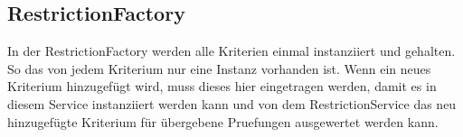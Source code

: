 \subsection{RestrictionFactory}\label{subsec:RestrictionFactory}
In der RestrictionFactory werden alle Kriterien einmal instanziiert und gehalten.
So das von jedem Kriterium nur eine Instanz vorhanden ist.
Wenn ein neues Kriterium hinzugefügt wird, muss dieses hier eingetragen werden, damit es
in diesem Service instanziiert werden kann und von dem RestrictionService das neu hinzugefügte
Kriterium für übergebene Pruefungen ausgewertet werden kann.
